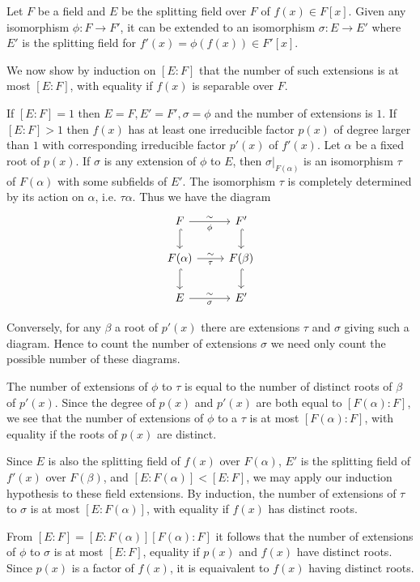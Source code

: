 \documentclass[a4paper]{article}
\begin{document}
Let $F$ be a field and $E$ be the splitting field over $F$ of $f(x) \in F[x]$. Given any isomorphism $\phi: F \rightarrow F'$, it can be extended to an isomorphism $\sigma: E \rightarrow E'$ where $E'$ is the splitting field for $f'(x) = \phi(f(x)) \in F'[x]$.

We now show by induction on $[E : F]$ that the number of such extensions is at most $[E : F]$, with equality if $f(x)$ is separable over $F$.

If $[E : F] = 1$ then $E = F, E' = F', \sigma = \phi$ and the number of extensions is $1$. If $[E : F] > 1$ then $f(x)$ has at least one irreducible factor $p(x)$ of degree larger than $1$ with corresponding irreducible factor $p'(x)$ of $f'(x)$. Let $\alpha$ be a fixed root of $p(x)$. If $\sigma$ is any extension of $\phi$ to $E$, then $\sigma|_{F(\alpha)}$ is an isomorphism $\tau$ of $F(\alpha)$ with some subfields of $E'$. The isomorphism $\tau$ is completely determined by its action on $\alpha$, i.e. $\tau\alpha$. Thus we have the diagram
\[
  \begin{tikzcd}
    F \arrow{r}{\sim}[swap]{\phi} \arrow[hook]{d} & F' \arrow[hook]{d}\\
    F(\alpha) \arrow{r}{\sim}[swap]{\tau} \arrow[hook]{d} & F(\beta) \arrow[hook]{d}\\
    E \arrow{r}{\sim}[swap]{\sigma} & E'
  \end{tikzcd}
\]

Conversely, for any $\beta$ a root of $p'(x)$ there are extensions $\tau$ and $\sigma$ giving such a diagram. Hence to count the number of extensions $\sigma$ we need only count the possible number of these diagrams.

The number of extensions of $\phi$ to $\tau$ is equal to the number of distinct roots of $\beta$ of $p'(x)$. Since the degree of $p(x)$ and $p'(x)$ are both equal to $[F(\alpha) : F]$, we see that the number of extensions of $\phi$ to a $\tau$ is at most $[F(\alpha) : F]$, with equality if the roots of $p(x)$ are distinct.

Since $E$ is also the splitting field of $f(x)$ over $F(\alpha)$, $E'$ is the splitting field of $f'(x)$ over $F(\beta)$, and $[E : F(\alpha)] < [E : F]$, we may apply our induction hypothesis to these field extensions. By induction, the number of extensions of $\tau$ to $\sigma$ is at most $[E : F(\alpha)]$, with equality if $f(x)$ has distinct roots.

From $[E : F] = [E: F(\alpha)] [F(\alpha) : F]$ it follows that the number of extensions of $\phi$ to $\sigma$ is at most $[E : F]$, equality if $p(x)$ and $f(x)$ have distinct roots. Since $p(x)$ is a factor of $f(x)$, it is equaivalent to $f(x)$ having distinct roots.
\end{document}
